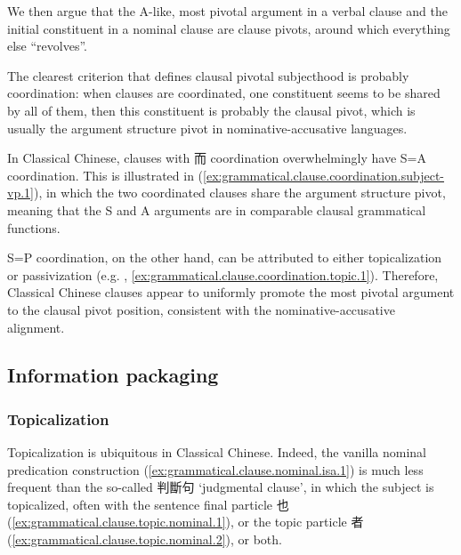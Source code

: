 \documentclass[UTF8, a4paper, oneside, scheme=plain, 12pt]{ctexrep}
\newcommand{\translate}[1]{`#1'}
\begin{document}
We then argue that the A-like, most pivotal argument in a verbal clause 
and the initial constituent in a nominal clause 
are clause pivots, around which everything else ``revolves''.

The clearest criterion that defines clausal pivotal subjecthood is probably coordination:
when clauses are coordinated,
one constituent seems to be shared by all of them,
then this constituent is probably the clausal pivot,
which is usually the argument structure pivot in nominative-accusative languages.

In Classical Chinese, clauses with 而 coordination overwhelmingly have S=A coordination.
This is illustrated in (\ref{ex:grammatical.clause.coordination.subject-vp.1}),
in which the two coordinated clauses share the argument structure pivot, meaning that the S and A arguments are in comparable clausal grammatical functions.

S=P coordination, on the other hand, can be attributed to either topicalization or passivization
(e.g. , \ref{ex:grammatical.clause.coordination.topic.1}).
Therefore, Classical Chinese clauses appear to uniformly promote the most pivotal argument to the clausal pivot position,
consistent with the nominative-accusative alignment.



\subsection{Information packaging}\label{sec:grammatical.clause.information}

\subsubsection{Topicalization}\label{sec:grammatical.clause.topic}

Topicalization is ubiquitous in Classical Chinese.
Indeed, the vanilla nominal predication construction (\ref{ex:grammatical.clause.nominal.isa.1}) 
is much less frequent than the so-called 判斷句 \translate{judgmental clause},
in which the subject is topicalized, often with the sentence final particle 也 (\ref{ex:grammatical.clause.topic.nominal.1}),
or the topic particle 者 (\ref{ex:grammatical.clause.topic.nominal.2}), or both.
\end{document}

